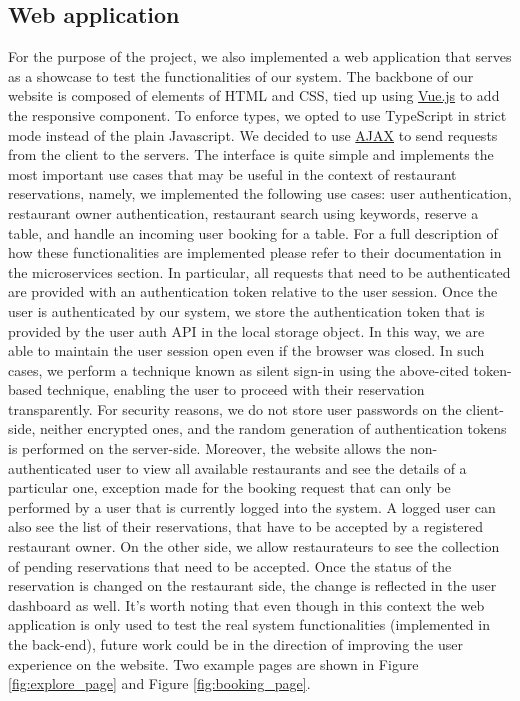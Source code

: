 \subsection{Web application}
For the purpose of the project, we also implemented a web application that serves
as a showcase to test the functionalities of our system. The backbone of our website
is composed of elements of HTML and CSS, tied up using \href{https://vuejs.org/}{Vue.js}
to add the responsive component. To enforce types, we opted to use TypeScript
in strict mode instead of the plain Javascript. We decided to use
\href{https://en.wikipedia.org/wiki/Ajax_(programming)}{AJAX} to send requests from the client to the servers. The interface is quite simple and implements the most important use cases that may be useful in the context of restaurant reservations, namely, we implemented the following use cases: user authentication, restaurant owner authentication, restaurant search using keywords, reserve a table, and handle an incoming user booking for a table. For a full description of how these functionalities are implemented please refer to their documentation in the microservices section. In particular, all requests that need to be authenticated are provided with an authentication token relative to the user session. Once the user is authenticated by our system, we store the authentication token that is provided by the user auth API in the local storage object. In this way, we are able to maintain the user session open even if the browser was closed. In such cases, we perform a technique known as silent sign-in using the above-cited token-based technique, enabling the user to proceed with their reservation transparently. For security reasons, we do not store user passwords on the client-side, neither encrypted ones, and the random generation of authentication tokens is performed on the server-side. Moreover, the website allows the non-authenticated user to view all available restaurants and see the details of a particular one, exception made for the booking request that can only be performed by a user that is currently logged into the system. A logged user can also see the list of their reservations, that have to be accepted by a registered restaurant owner. On the other side, we allow restaurateurs to see the collection of pending reservations that need to be accepted. Once the status of the reservation is changed on the restaurant side, the change is reflected in the user dashboard as well. It's worth noting that even though in this context the web application is only used to test the real system functionalities (implemented in the back-end), future work could be in the direction of improving the user experience on the website.
Two example pages are shown in Figure \ref{fig:explore_page} and Figure \ref{fig:booking_page}.

